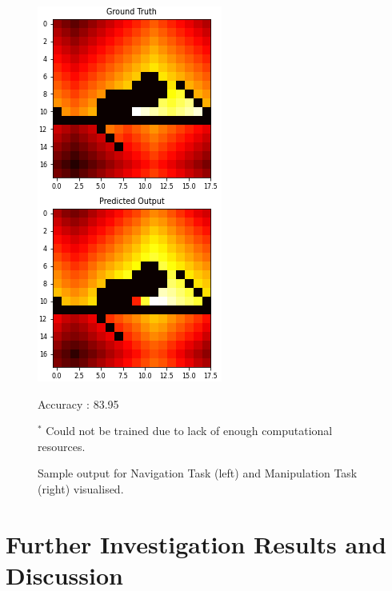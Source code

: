 \begin{figure}[!htb]
\begin{minipage}{0.5\textwidth}
     \includegraphics[width=.7\linewidth]{../openreview/images/media_images_test_samples_9998_0(1)(1)(1).png}
    \caption{Accuracy : 83.95}
   \end{minipage}
   \caption{Sample output for Navigation Task (left) and Manipulation Task (right) visualised.}
   \footnotesize{ \vspace{2pt}
   $^*$ Could not be trained due to lack of enough computational resources.}\\
\end{figure}

\section{Further Investigation Results and Discussion}
\label{sec:inves results}

